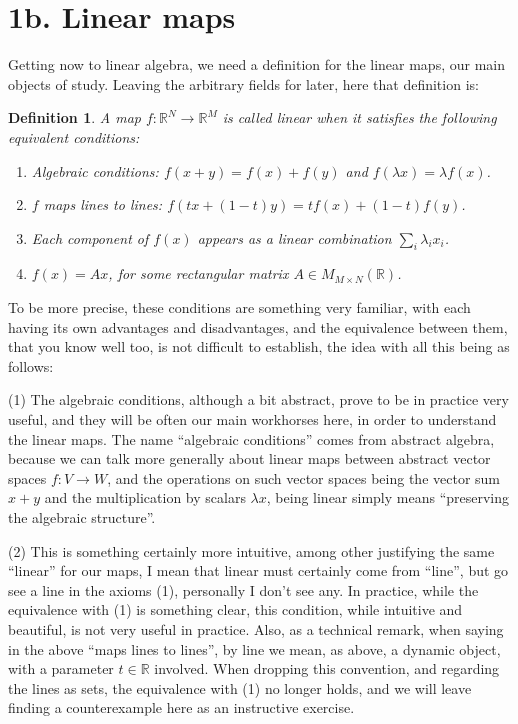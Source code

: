 \documentclass[12pt]{amsbook}
\newtheorem{definition}[theorem]{Definition}
\begin{document}
\section*{1b. Linear maps}

Getting now to linear algebra, we need a definition for the linear maps, our main objects of study. Leaving the arbitrary fields for later, here that definition is:


\begin{definition}
A map $f:\mathbb R^N\to\mathbb R^M$ is called linear when it satisfies the following equivalent conditions:
\begin{enumerate}
\item Algebraic conditions: $f(x+y)=f(x)+f(y)$ and $f(\lambda x)=\lambda f(x)$.

\item $f$ maps lines to lines: $f(tx+(1-t)y)=tf(x)+(1-t)f(y)$.

\item Each component of $f(x)$ appears as a linear combination $\sum_i\lambda_ix_i$.

\item $f(x)=Ax$, for some rectangular matrix $A\in M_{M\times N}(\mathbb R)$.
\end{enumerate}
\end{definition}

To be more precise, these conditions are something very familiar, with each having its own advantages and disadvantages, and the equivalence between them, that you know well too, is not difficult to establish, the idea with all this being as follows:

\bigskip

(1) The algebraic conditions, although a bit abstract, prove to be in practice very useful, and they will be often our main workhorses here, in order to understand the linear maps. The name ``algebraic conditions'' comes from abstract algebra, because we can talk more generally about linear maps between abstract vector spaces $f:V\to W$, and the operations on such vector spaces being the vector sum $x+y$ and the multiplication by scalars $\lambda x$, being linear simply means ``preserving the algebraic structure''.

\bigskip

(2) This is something certainly more intuitive, among other justifying the same ``linear'' for our maps, I mean that linear must certainly come from ``line'', but go see a line in the axioms (1), personally I don't see any. In practice, while the equivalence with (1) is something clear, this condition, while intuitive and beautiful, is not very useful in practice. Also, as a technical remark, when saying in the above ``maps lines to lines'', by line we mean, as above, a dynamic object, with a parameter $t\in\mathbb R$ involved. When dropping this convention, and regarding the lines as sets, the equivalence with (1) no longer holds, and we will leave finding a counterexample here as an instructive exercise.
\end{document}
